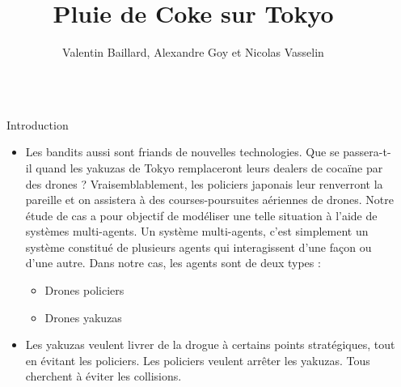 \documentclass[final,hyperref={pdfpagelabels=false}]{beamer}
\title{\Huge Pluie de Coke sur Tokyo} %
\author{Valentin Baillard, Alexandre Goy et Nicolas Vasselin} %
\institute{Fili\`ere M\'etiers de la Recherche, CentraleSup\'elec, sous la supervision de Cristina Maniu} %
\begin{document}

\begin{frame}[t] %

\begin{columns}[t] %

\begin{column}{.02\textwidth}\end{column} %

\begin{column}{.465\textwidth} %

            
\begin{block}{Introduction}

\begin{itemize}
\item \justify Les bandits aussi sont friands de nouvelles technologies. Que se passera-t-il quand les yakuzas de Tokyo remplaceront leurs dealers de coca\"{i}ne par des drones ? Vraisemblablement, les policiers japonais leur renverront la pareille et on assistera à des courses-poursuites a\'eriennes de drones. Notre \'etude de cas a pour objectif de mod\'eliser une telle situation à l'aide de syst\`emes multi-agents. Un syst\`eme multi-agents, c'est simplement un syst\`eme constitu\'e de plusieurs agents qui interagissent d'une fa\c{c}on ou d'une autre. Dans notre cas, les agents sont de deux types :
\begin{itemize}
\item Drones policiers
\item Drones yakuzas
\end{itemize}
\item Les yakuzas veulent livrer de la drogue \`a certains points strat\'egiques, tout en \'evitant les policiers. Les policiers veulent arr\^eter les yakuzas. Tous cherchent \`a \'eviter les collisions.
\end{itemize}

\end{block}


\end{column}
\end{columns}
\end{frame}
\end{document}
